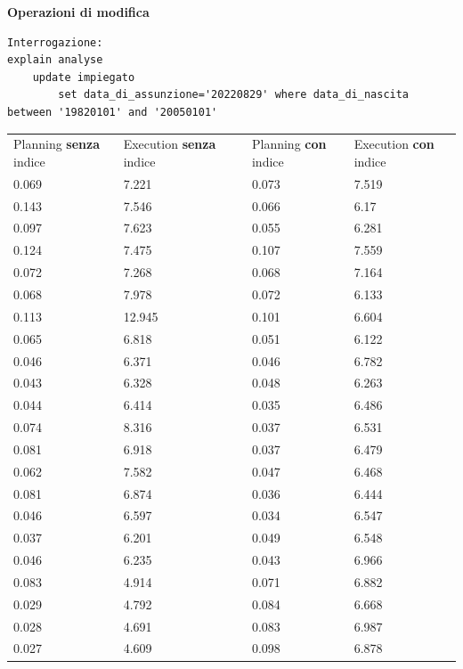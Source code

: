 \documentclass{article}
\begin{document}
\newpage
\noindent
\textbf{Operazioni di modifica}
\begin{verbatim}
Interrogazione:
explain analyse 
    update impiegato 
        set data_di_assunzione='20220829' where data_di_nascita between '19820101' and '20050101'
\end{verbatim}
\begin{table}[H]
\renewcommand{\arraystretch}{1.2}
\centering
\begin{tabular}{|p{4cm}|p{4cm}|p{0cm}|p{4cm}|p{4cm}|}
\cline{1-5}
Planning \textbf{senza} indice & Execution \textbf{senza} indice & & Planning \textbf{con} indice & Execution \textbf{con} indice \\ \cline{1-5}
0.069 & 7.221 & & 0.073 & 7.519 \\ \cline{1-5}
0.143 & 7.546 & & 0.066 & 6.17 \\ \cline{1-5}
0.097 & 7.623 & & 0.055 & 6.281 \\ \cline{1-5}
0.124 & 7.475 & & 0.107 & 7.559 \\ \cline{1-5}
0.072 & 7.268 & & 0.068 & 7.164 \\ \cline{1-5}
0.068 & 7.978 & & 0.072 & 6.133 \\ \cline{1-5}
0.113 & 12.945 & & 0.101 & 6.604 \\ \cline{1-5}
0.065 & 6.818 & & 0.051 & 6.122 \\ \cline{1-5}
0.046 & 6.371 & & 0.046 & 6.782 \\ \cline{1-5}
0.043 & 6.328 & & 0.048 & 6.263 \\ \cline{1-5}
0.044 & 6.414 & & 0.035 & 6.486 \\ \cline{1-5}
0.074 & 8.316 & & 0.037 & 6.531 \\ \cline{1-5}
0.081 & 6.918 & & 0.037 & 6.479 \\ \cline{1-5}
0.062 & 7.582 & & 0.047 & 6.468 \\ \cline{1-5}
0.081 & 6.874 & & 0.036 & 6.444 \\ \cline{1-5}
0.046 & 6.597 & & 0.034 & 6.547 \\ \cline{1-5}
0.037 & 6.201 & & 0.049 & 6.548 \\ \cline{1-5}
0.046 & 6.235 & & 0.043 & 6.966 \\ \cline{1-5}
0.083 & 4.914 & & 0.071 & 6.882 \\ \cline{1-5}
0.029 & 4.792 & & 0.084 & 6.668 \\ \cline{1-5}
0.028 & 4.691 & & 0.083 & 6.987 \\ \cline{1-5}
0.027 & 4.609 & & 0.098 & 6.878 \\ \cline{1-5}

\end{tabular}
\end{table}
\end{document}
